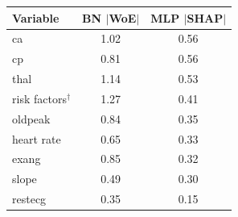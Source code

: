 \begin{tabular}{lcc}
\toprule
Variable & BN $|$WoE$|$ & MLP $|$SHAP$|$ \\
\midrule
ca & 1.02 & 0.56 \\
cp & 0.81 & 0.56 \\
thal & 1.14 & 0.53 \\
risk factors$^\dagger$ & 1.27 & 0.41 \\
oldpeak & 0.84 & 0.35 \\
heart rate & 0.65 & 0.33 \\
exang & 0.85 & 0.32 \\
slope & 0.49 & 0.30 \\
restecg & 0.35 & 0.15 \\
\bottomrule
\end{tabular}

